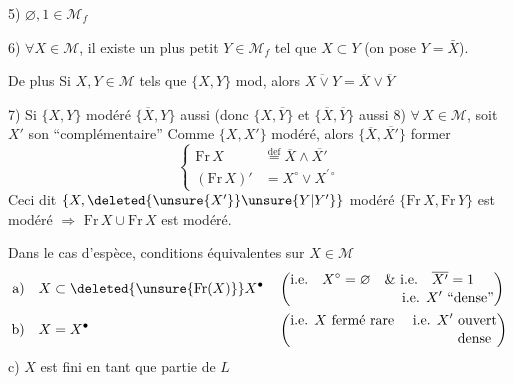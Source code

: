 5) $\varnothing,1\in\mathcal M_f$

6) $\forall X\in\mathcal M$, il existe un plus petit  $Y\in\mathcal M_f$ tel que $X\subset Y$ (on pose $Y=\bar X$).

De plus Si $X,Y\in\mathcal M$ tels que $\{X,Y\}$ mod, alors $\overline{X\vee Y}=\overline X\vee\overline Y$

7) Si $\{X,Y\}$ modéré $\{\overline X,Y\}$ aussi (donc $\{X,\overline Y\}$ et $\{\overline X,\overline Y\}$ aussi
8) $\forall\,X\in\mathcal M$, soit $X'$ son ``complémentaire''  Comme $\{X,X'\}$ modéré, alors $\{\overline X,\overline{X'}\}$   former
\[
\left\{\begin{aligned}
\mathrm{Fr}\,X &\overset{\text{def}}{=} \overline X\wedge\overline{X'}\\
(\mathrm{Fr}\,X)' &= X^{\circ}\vee X^{\prime\circ}
\end{aligned}\right.
\]
Ceci dit $\{X,\deleted{\unsure{X'}}\unsure{Y|Y'}\}$ modéré  $\{\mathrm{Fr}\,X,\mathrm{Fr}\,Y\}$ est modéré $\Longrightarrow$ $\mathrm{Fr}\,X\cup\mathrm{Fr}\,X$ est modéré.

   

Dans le cas d'espèce, conditions équivalentes sur $X\in\mathcal M$
\[
\begin{aligned}
\text{a)}\quad & X\subset\deleted{\unsure{\mathrm{Fr}(X)}}X^{\bullet}
&&\left(\begin{aligned}&\text{i.e.}\quad X^{\circ}=\varnothing\quad\&\ \text{i.e.}\quad\overline{X'}=1\\[-2pt]&\hspace{8em}\text{i.e. }X'\text{ ``dense''}\end{aligned}\right)\\
\text{b)}\quad & X=X^{\bullet}
&&\left(\begin{aligned}&\text{i.e. }X\text{ fermé rare \quad i.e. }X'\text{ ouvert}\\[-2pt]&\hspace{12em}\text{dense}\end{aligned}\right)
\end{aligned}
\]
c) $X$ est fini en tant que partie de $L$

